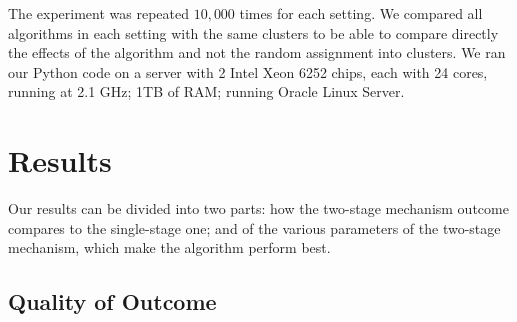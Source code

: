 \documentclass[letterpaper]{article} %
\newcommand{\omer}[1]{\textcolor{red}{\textbf{Omer Says:} #1 }}
\begin{document}
The experiment was repeated $10,000$ times for each setting. We compared all algorithms in each setting with the same clusters to be able to compare directly the effects of the algorithm and not the random assignment into clusters. We ran our Python code on a server with 2 Intel Xeon 6252 chips, each with 24 cores, running at 2.1 GHz; 1TB of RAM; running Oracle Linux Server.


\section{Results}\label{results}
Our results can be divided into two parts: how the two-stage mechanism outcome compares to the single-stage one; and of the various parameters of the two-stage mechanism, which make the algorithm perform best.




\subsection{Quality of Outcome}
\end{document}
